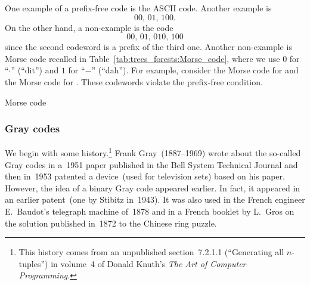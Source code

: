 One example of a prefix-free code is the
ASCII code. Another example is
\[
00,\, 01,\, 100.
\]
On the other hand, a non-example is the code
\[
00,\, 01,\, 010,\, 100
\]
since the second codeword is a prefix of the third one. Another
non-example is Morse code recalled in
Table~\ref{tab:trees_forests:Morse_code}, where we use $0$ for
``$\cdot$'' (``dit'') and $1$ for ``$-$'' (``dah''). For example,
consider the Morse code for \tta and the Morse code
for \ttw. These codewords violate the prefix-free condition.

\begin{table}[!htbp]
\centering
{}

\caption{Morse code}
\label{tab:trees_forests:Morse_code}
\end{table}



\subsubsection{Gray codes}

We begin with some history.\footnote{
  This history comes from an unpublished section~7.2.1.1
  (``Generating all $n$-tuples'') in volume~4 of
  Donald Knuth's
  \emph{The Art of Computer Programming}.
}
Frank Gray~(1887--1969) wrote about the so-called
Gray codes in a~1951 paper published in the Bell
System Technical Journal and then in~1953 patented a device~(used for
television sets) based on his paper. However, the idea of a
binary Gray code appeared earlier. In fact, it
appeared in an earlier patent~(one by Stibitz in~1943). It
was also used in the French engineer E.~Baudot's
telegraph machine of~1878 and in a French booklet by
L.~Gros on the solution published in~1872 to the
Chinese ring puzzle.

